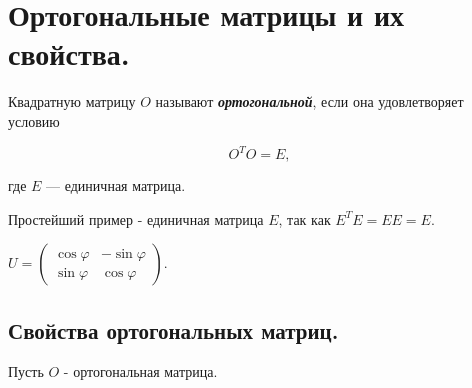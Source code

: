 \section{
    Ортогональные матрицы и их свойства.
}

\begin{definition}
    Квадратную матрицу $O$ называют \textbf{\textit{ортогональной}}, если она удовлетворяет условию

    \begin{equation}
        O^TO = E,
        \label{eq:equation_33_1}
    \end{equation}

    где $E$ — единичная матрица.
\end{definition}

\begin{example}
    Простейший пример - единичная матрица $E$, так как $E^TE = EE = E$.
\end{example}

\begin{example}
    $U = \begin{pmatrix}
    \cos \varphi & -\sin \varphi \\
    \sin \varphi & \cos \varphi
    \end{pmatrix}$.
\end{example}

\subsection*{Свойства ортогональных матриц.}

Пусть $O$ - ортогональная матрица.

